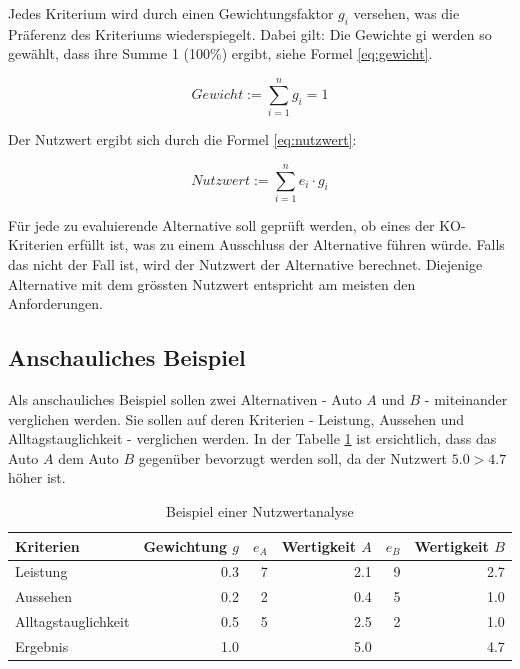   Jedes Kriterium wird durch einen Gewichtungsfaktor \(g_i\) versehen, was
  die Präferenz des Kriteriums wiederspiegelt. Dabei gilt: Die Gewichte gi
  werden so gewählt, dass ihre Summe 1 (100\%) ergibt, siehe Formel
  \ref{eq:gewicht}.
  \newline

  \begin{equation}
    \label{eq:gewicht}
    Gewicht := \sum \limits_{i=1}^n g_i = 1
  \end{equation}

  \newpage
  
  \noindent
  Der Nutzwert ergibt sich durch die Formel \ref{eq:nutzwert}:
  \newline

  \begin{equation}
    \label{eq:nutzwert}
    Nutzwert := \sum \limits_{i=1}^n e_i \cdot g_i
  \end{equation}
  \newline
  
  \noindent
  Für jede zu evaluierende Alternative soll geprüft werden, ob eines der
  KO-Kriterien erfüllt ist, was zu einem Ausschluss der Alternative führen
  würde. Falls das nicht der Fall ist, wird der Nutzwert der Alternative
  berechnet. Diejenige Alternative mit dem grössten Nutzwert entspricht am
  meisten den Anforderungen.
  
  \subsection{Anschauliches Beispiel}
  
  Als anschauliches Beispiel sollen zwei Alternativen - Auto \(A\) und \(B\) -
  miteinander verglichen werden. Sie sollen auf deren Kriterien - Leistung,
  Aussehen und Alltagstauglichkeit - verglichen werden. In der Tabelle
  \ref{tab:beispielNwa} ist ersichtlich, dass das Auto \(A\) dem Auto \(B\)
  gegenüber bevorzugt werden soll, da der Nutzwert \(5.0 > 4.7\) höher ist.
  \newline
  
  \begin{table}[ht]
    \sffamily 
    \begin{center}
      \begin{tabular}{lrrrrr}
        \toprule
        Kriterien & Gewichtung \(g\) & \(e_A\) & Wertigkeit \(A\) & \(e_B\)
        & Wertigkeit \(B\)\\
        \midrule
        Leistung            & 0.3 & 7 & 2.1 & 9 & 2.7 \\
        Aussehen            & 0.2 & 2 & 0.4 & 5 & 1.0 \\
        Alltagstauglichkeit & 0.5 & 5 & 2.5 & 2 & 1.0 \\
        \midrule
        \midrule
        Ergebnis            & 1.0 &   & 5.0 &   & 4.7 \\
        \bottomrule
      \end{tabular}
      \caption{Beispiel einer Nutzwertanalyse}
      \label{tab:beispielNwa}
    \end{center}
  \end{table}
 
